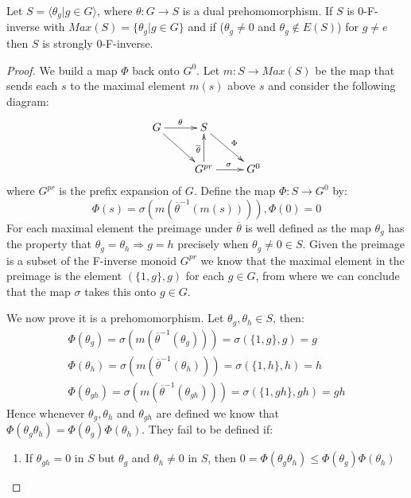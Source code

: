 \begin{proposition}\label{Prop:Strongly}
Let $S = \langle \theta_{g} | g \in G \rangle$, where $\theta: G \rightarrow S$ is a dual prehomomorphism. If $S$ is 0-F-inverse with $Max(S) = \lbrace \theta_{g} | g \in G \rbrace$ and if  ($\theta_{g} \not = 0$ and $\theta_{g} \not \in E(S)$) for $g\not = e$ then $S$ is strongly 0-F-inverse.
\end{proposition}
\begin{proof}
We build a map $\Phi$ back onto $G^{0}$. Let $m: S \rightarrow Max(S)$ be the map that sends each $s$ to the maximal element $m(s)$ above $s$ and consider the following diagram:
\begin{equation*}
\xymatrix{
G\ar@{->}[r]^{\theta}\ar@{->}[dr]^{}  & S\ar@{->}[dr]^{\Phi}  & \\
  & G^{pr} \ar@{->}[r]^{\sigma}\ar@{->}[u]^{\overline{\theta}}  & G^{0}
}
\end{equation*}
where $G^{pr}$ is the prefix expansion of $G$. Define the map $\Phi:S \rightarrow G^{0}$ by:
\begin{equation*}
\Phi(s)=\sigma ( m ( \overline{\theta}^{-1} (m(s)))), \Phi(0)=0
\end{equation*}
For each maximal element the preimage under $\overline{\theta}$ is well defined as the map $\theta_{g}$ has the property that $\theta_{g}=\theta_{h} \Rightarrow g=h$ precisely when $\theta_{g} \not = 0 \in S$. Given the preimage is a subset of the F-inverse monoid $G^{pr}$ we know that the maximal element in the preimage is the element $(\lbrace 1,g \rbrace,g)$ for each $g \in G$, from where we can conclude that the map $\sigma$ takes this onto $g \in G$.

We now prove it is a prehomomorphism. Let $\theta_{g},\theta_{h} \in S$, then:
\begin{eqnarray*}
\Phi(\theta_{g})=\sigma ( m(\overline{\theta}^{-1}(\theta_{g}))) = \sigma ( \lbrace 1,g \rbrace, g)= g\\
\Phi(\theta_{h})=\sigma ( m(\overline{\theta}^{-1}(\theta_{h}))) = \sigma ( \lbrace 1,h \rbrace, h)= h\\
\Phi(\theta_{gh})=\sigma ( m(\overline{\theta}^{-1}(\theta_{gh}))) = \sigma ( \lbrace 1,gh \rbrace, gh)= gh
\end{eqnarray*}
Hence whenever $\theta_{g},\theta_{h}$ and $\theta_{gh}$ are defined we know that $\Phi(\theta_{g}\theta_{h})=\Phi(\theta_{g})\Phi(\theta_{h})$. They fail to be defined if:
\begin{enumerate}
\item If $\theta_{gh} = 0$ in $S$ but $\theta_{g}$ and $\theta_{h} \not = 0$ in $S$, then $0=\Phi(\theta_{g}\theta_{h})\leq \Phi(\theta_{g})\Phi(\theta_{h})$


\end{enumerate}
\end{proof}
